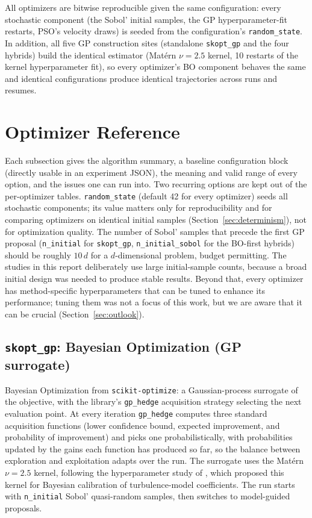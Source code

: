 All optimizers are bitwise reproducible given the same configuration: every
stochastic component (the Sobol' initial samples, the GP
hyperparameter-fit restarts, PSO's velocity draws) is seeded from the
configuration's \texttt{random\_state}.  In addition, all five GP
construction sites (standalone \texttt{skopt\_gp} and the four hybrids)
build the identical estimator (Mat\'ern $\nu=2.5$ kernel, 10 restarts of
the kernel hyperparameter fit), so every optimizer's BO component behaves
the same and identical configurations produce identical trajectories across
runs and resumes.

\section{Optimizer Reference}
\label{sec:optimizers}

Each subsection gives the algorithm summary, a baseline configuration block
(directly usable in an experiment JSON), the meaning and valid range of every
option, and the issues one can run into.  Two recurring options are kept out
of the per-optimizer tables.  \texttt{random\_state} (default 42 for every
optimizer) seeds all stochastic components; its value matters only for
reproducibility and for comparing optimizers on identical initial samples
(Section~\ref{sec:determinism}), not for optimization quality.  The number
of Sobol' samples that precede the first GP proposal (\texttt{n\_initial}
for \texttt{skopt\_gp}, \texttt{n\_initial\_sobol} for the BO-first hybrids)
should be roughly $10\,d$ for a $d$-dimensional problem, budget permitting.
The studies in this report deliberately use large initial-sample counts,
because a broad initial design was needed to produce stable results.
Beyond that, every optimizer has method-specific hyperparameters that can
be tuned to enhance its performance; tuning them was not a focus of this
work, but we are aware that it can be crucial
(Section~\ref{sec:outlook}).

\subsection{\texttt{skopt\_gp}: Bayesian Optimization (GP surrogate)}
\label{sec:opt-bo}

Bayesian Optimization from \texttt{scikit-optimize}: a Gaussian-process
surrogate of the objective, with the library's \texttt{gp\_hedge}
acquisition strategy selecting the next evaluation point.  At every
iteration \texttt{gp\_hedge} computes three standard acquisition
functions (lower confidence bound, expected improvement, and probability
of improvement) and picks one probabilistically, with probabilities
updated by the gains each function has produced so far, so the balance
between exploration and exploitation adapts over the run.  The surrogate
uses the Mat\'ern $\nu = 2.5$ kernel, following the hyperparameter study
of \cite{bo_hyperparams_ref}, which proposed this kernel for Bayesian
calibration of turbulence-model coefficients.  The run starts with
\texttt{n\_initial} Sobol' quasi-random samples, then switches to
model-guided proposals.

